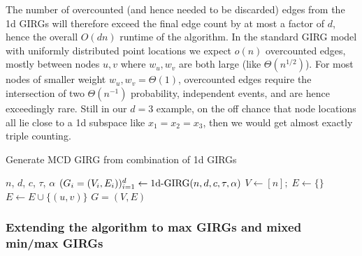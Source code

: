 The number of overcounted (and hence needed to be discarded) edges from the 1d GIRGs will therefore exceed the final edge count by at most a factor of $d$, hence the overall $O(dn)$ runtime of the algorithm. In the standard GIRG model with uniformly distributed point locations we expect $o(n)$ overcounted edges, mostly between nodes $u,v$ where $w_u, w_v$ are both large (like $\Theta(n^{1/2})$). For most nodes of smaller weight $w_u, w_v = \Theta(1)$, overcounted edges require the intersection of two $\Theta(n^{-1})$ probability, independent events, and are hence exceedingly rare. Still in our $d=3$ example, on the off chance that node locations all lie close to a 1d subspace like $x_1 = x_2 = x_3$, then we would get almost exactly triple counting.


\begin{algorithm}
    \caption{Generate MCD GIRG from combination of 1d GIRGs}
    \label{alg:mcd_1d_combination_algo}
    
    \begin{algorithmic}
    \Require $n$, $d$, $c$, $\tau$, $\alpha$
    \State $(G_i = (V_i, E_i))_{i=1}^d \gets \text{1d-}\mathrm{GIRG}(n,d,c,\tau, \alpha)$
    \State $V \gets [n];\; E \gets \{\}$
                \State $E \gets E \cup \{(u, v)\}$
            \EndIf
        \EndFor
    \EndFor
    \State \Return $G=(V,E)$
\end{algorithmic}
\end{algorithm}


\subsubsection{Extending the algorithm to max GIRGs and mixed min/max GIRGs}
